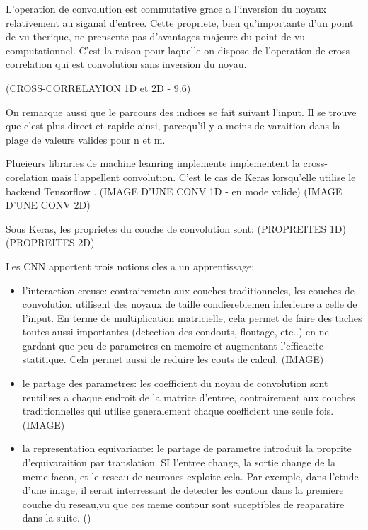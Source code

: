 L'operation de convolution est commutative grace a l'inversion du noyaux relativement au siganal d'entree. Cette propriete, bien qu'importante d'un point de vu therique, ne prensente pas d'avantages majeure du point de vu computationnel. C'est la raison pour laquelle on dispose de l'operation de cross-correlation qui est convolution sans inversion du noyau.

(CROSS-CORRELAYION 1D et 2D - 9.6)

On remarque aussi que le parcours des indices se fait suivant l'input. Il se trouve que c'est plus direct et rapide ainsi, parcequ'il y a moins de varaition dans la plage de valeurs valides pour n et m. 

Plueieurs libraries de machine leanring implemente implementent la cross-corelation mais l'appellent convolution. C'est le cas de Keras lorsqu'elle utilise le backend Tensorflow \parencite{Reference5}.
(IMAGE D'UNE CONV 1D - en mode valide)
(IMAGE D'UNE CONV 2D)

Sous Keras, les proprietes du couche de convolution sont:
(PROPREITES 1D)
(PROPREITES 2D)


Les CNN apportent trois notions cles a un apprentissage:
\begin{itemize}
 \item l'interaction creuse: contrairemetn aux couches traditionneles, les couches de convolution utilisent des noyaux de taille condiereblemen inferieure a celle de l'input. En terme de multiplication matricielle, cela permet de faire des taches toutes aussi importantes (detection des condouts, floutage, etc..) en ne gardant que peu de parametres en memoire et augmentant l'efficacite statitique. Cela permet aussi de reduire les couts de calcul.
 (IMAGE)
 \item le partage des parametres: les coefficient du noyau de convolution sont reutilises a chaque endroit de la matrice d'entree, contrairement aux couches traditionnelles qui utilise generalement chaque coefficient une seule fois.
 (IMAGE)
 \item la representation equivariante: le partage de parametre introduit la proprite d'equivaraition par translation. SI l'entree change, la sortie change de la meme facon, et le reseau de neurones exploite cela. Par exemple, dans l'etude d'une image, il serait interressant de detecter les contour dans la premiere couche du reseau,vu que ces meme contour sont suceptibles de reaparatire dans la suite. (\parencite{Reference5})
\end{itemize}


